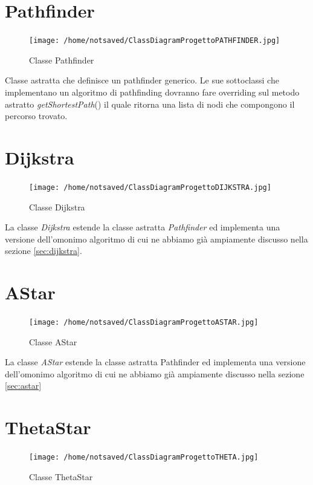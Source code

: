 \documentclass[11pt]{book}
\begin{document}
\section{Pathfinder}

\begin{figure}[H]
\centering
\texttt{[image: /home/notsaved/ClassDiagramProgettoPATHFINDER.jpg]}
\caption{Classe Pathfinder}
\label{classpathfind}
\end{figure}

Classe astratta che definisce un pathfinder generico. Le sue sottoclassi che implementano un algoritmo di pathfinding dovranno fare overriding sul metodo astratto \emph{getShortestPath}() il quale ritorna una lista di nodi che compongono il percorso trovato.

\section{Dijkstra}

\begin{figure}[H]
\centering
\texttt{[image: /home/notsaved/ClassDiagramProgettoDIJKSTRA.jpg]}
\caption{Classe Dijkstra}
\label{classdijkstra}
\end{figure}

La classe \emph{Dijkstra} estende la classe astratta \emph{Pathfinder} ed implementa una versione dell'omonimo algoritmo di cui ne abbiamo gi\`a ampiamente discusso nella sezione \ref{sec:dijkstra}.

\section{AStar}

\begin{figure}[H]
\centering
\texttt{[image: /home/notsaved/ClassDiagramProgettoASTAR.jpg]}
\caption{Classe AStar}
\label{classastar}
\end{figure}

La classe \emph{AStar} estende la classe astratta Pathfinder ed implementa una versione dell'omonimo algoritmo di cui ne abbiamo gi\`a ampiamente discusso nella sezione \ref{sec:astar}

\section{ThetaStar}

\begin{figure}[H]
\centering
\texttt{[image: /home/notsaved/ClassDiagramProgettoTHETA.jpg]}
\caption{Classe ThetaStar}
\label{classtheta}
\end{figure}
\end{document}
